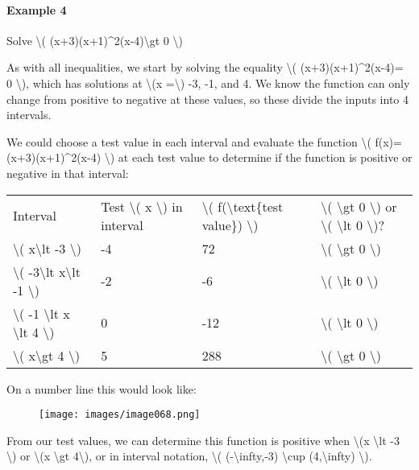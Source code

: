 \hypertarget{example-4}{%
\paragraph{Example 4}\label{example-4}}

Solve \textbackslash{}( (x+3)(x+1)\^{}2(x-4)\textbackslash{}gt 0
\textbackslash{})

As with all inequalities, we start by solving the equality
\textbackslash{}( (x+3)(x+1)\^{}2(x-4)= 0 \textbackslash{}), which has
solutions at \textbackslash{}(x =\textbackslash{}) -3, -1, and 4. We
know the function can only change from positive to negative at these
values, so these divide the inputs into 4 intervals.

We could choose a test value in each interval and evaluate the function
\textbackslash{}( f(x)=(x+3)(x+1)\^{}2(x-4) \textbackslash{}) at each
test value to determine if the function is positive or negative in that
interval:

\begin{longtable}[]{@{}llll@{}}
\toprule
\endhead
Interval & Test \textbackslash{}( x \textbackslash{}) in interval &
\textbackslash{}( f(\textbackslash{}text\{test value\})
\textbackslash{}) & \textbackslash{}( \textbackslash{}gt 0
\textbackslash{}) or \textbackslash{}( \textbackslash{}lt 0
\textbackslash{})?\tabularnewline
\textbackslash{}( x\textbackslash{}lt -3 \textbackslash{}) & -4 & 72 &
\textbackslash{}( \textbackslash{}gt 0 \textbackslash{})\tabularnewline
\textbackslash{}( -3\textbackslash{}lt x\textbackslash{}lt -1
\textbackslash{}) & -2 & -6 & \textbackslash{}( \textbackslash{}lt 0
\textbackslash{})\tabularnewline
\textbackslash{}( -1 \textbackslash{}lt x \textbackslash{}lt 4
\textbackslash{}) & 0 & -12 & \textbackslash{}( \textbackslash{}lt 0
\textbackslash{})\tabularnewline
\textbackslash{}( x\textbackslash{}gt 4 \textbackslash{}) & 5 & 288 &
\textbackslash{}( \textbackslash{}gt 0 \textbackslash{})\tabularnewline
\bottomrule
\end{longtable}

On a number line this would look like:

\begin{figure}
\centering
\texttt{[image: images/image068.png]}
\caption{}
\end{figure}

From our test values, we can determine this function is positive when
\textbackslash{}(x \textbackslash{}lt -3 \textbackslash{}) or
\textbackslash{}(x \textbackslash{}gt 4\textbackslash{}), or in interval
notation, \textbackslash{}( (-\textbackslash{}infty,-3)
\textbackslash{}cup (4,\textbackslash{}infty) \textbackslash{}).

